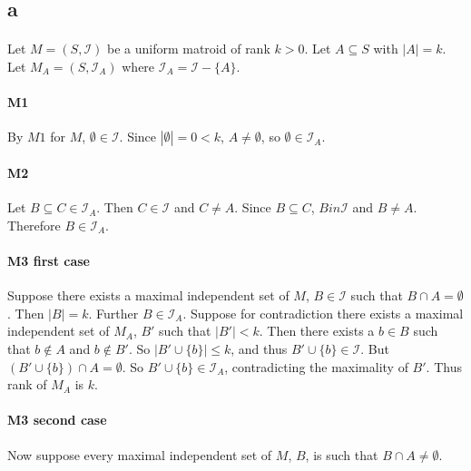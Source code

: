\documentclass[letterpaper,12pt,oneside,onecolumn]{report}
\begin{document}
\subsection*{a}
\paragraph{}
Let $M = (S,\mathcal{I})$ be a uniform matroid of rank $k > 0$. Let $A \subseteq S$ with $|A| = k$. Let $M_A = (S, \mathcal{I}_A)$ where $\mathcal{I}_A = \mathcal{I} - \{A\}$.
\paragraph{M1}
By $M1$ for $M$, $\emptyset \in \mathcal{I}$. Since $|\emptyset| = 0 < k$, $A \neq \emptyset$, so $\emptyset \in \mathcal{I}_A$.
\paragraph{M2}
Let $B \subseteq C \in \mathcal{I}_A$. Then $C \in \mathcal{I}$ and $C \neq A$. Since $B \subseteq C$, $B in \mathcal{I}$ and $B \neq A$. Therefore $B \in \mathcal{I}_A$.
\paragraph{M3 first case}
Suppose there exists a maximal independent set of $M$, $B \in \mathcal{I}$ such that $B \cap A = \emptyset$. Then $|B| = k$. Further $B \in \mathcal{I}_A$. Suppose for contradiction there exists a maximal independent set of $M_A$, $B'$ such that $|B'| < k$. Then there exists a $b \in B$ such that $b \not\in A$ and $b \not\in B'$. So $|B' \cup \{b\}| \leq k$, and thus $B' \cup \{b\} \in \mathcal{I}$. But $(B' \cup \{b\}) \cap A = \emptyset$. So $B' \cup \{b\} \in \mathcal{I}_A$, contradicting the maximality of $B'$. Thus rank of $M_A$ is $k$.
\paragraph{M3 second case}
Now suppose every maximal independent set of $M$, $B$, is such that $B \cap A \neq \emptyset$.
\end{document}
